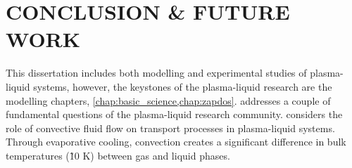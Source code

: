 \chapter{CONCLUSION \& FUTURE WORK}
\label{chap:conclusion}

This dissertation includes both modelling and experimental studies of plasma-liquid systems, however, the keystones of the plasma-liquid research are the modelling chapters, \cref{chap:basic_science,chap:zapdos}.  addresses a couple of fundamental questions of the plasma-liquid research community.  considers the role of convective fluid flow on transport processes in plasma-liquid systems. Through evaporative cooling, convection creates a significant difference in bulk temperatures (\~10 K) between gas and liquid phases.
